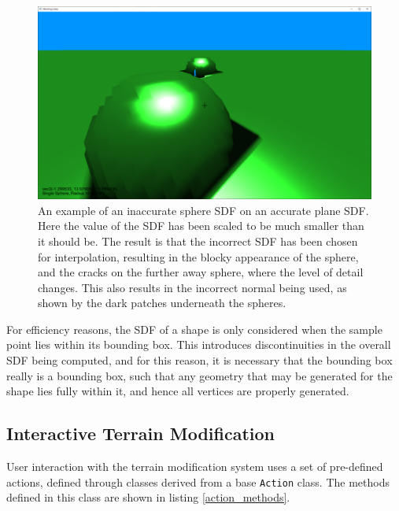 \documentclass{article}
\begin{document}
\begin{figure}[H]
  \includegraphics[width=\textwidth]{inaccurate_sdf.png}
  \caption{An example of an inaccurate sphere SDF on an accurate plane SDF. Here the value of the SDF has been scaled to be much smaller than it should be. The result is that the incorrect SDF has been chosen for interpolation, resulting in the blocky appearance of the sphere, and the cracks on the further away sphere, where the level of detail changes. This also results in the incorrect normal being used, as shown by the dark patches underneath the spheres.}
  \label{fig:inaccurate_sdf}
\end{figure}

For efficiency reasons, the SDF of a shape is only considered when the sample point lies within its bounding box. This introduces discontinuities in the overall SDF being computed, and for this reason, it is necessary that the bounding box really is a bounding box, such that any geometry that may be generated for the shape lies fully within it, and hence all vertices are properly generated. 

\subsection{Interactive Terrain Modification}
User interaction with the terrain modification system uses a set of pre-defined actions, defined through classes derived from a base \texttt{Action} class. The methods defined in this class are shown in listing \ref{action_methods}.
\end{document}
